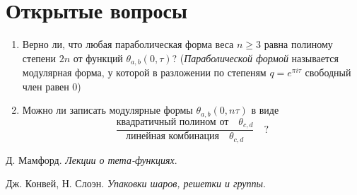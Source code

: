 \documentclass{article}
\theoremstyle{break}
\begin{document}
\section{Открытые вопросы}
\begin{enumerate}
	\item Верно ли, что любая параболическая форма веса $n \ge 3$ равна полиному
	степени $2n$ от функций $\theta_{a, b}(0, \tau)$?
	(\textit{Параболической формой} называется модулярная форма, у которой в разложении по степеням $q=e^{\pi i \tau}$ свободный член равен 0)
	\item Можно ли записать модулярные формы $\theta_{a, b}(0, n\tau)$ в виде
	\begin{equation}
	\frac{\text{квадратичный полином от} \quad \theta_{c, d}}{\text{линейная комбинация} \quad \theta_{c, d}}
	\quad ?
	\end{equation}
\end{enumerate}

\begin{thebibliography}{999}
	
	Д. Мамфорд.
	\emph{Лекции о тета-функциях}.
	
	Дж. Конвей, Н. Слоэн. 
	\emph{Упаковки шаров, решетки и группы}.
	
\end{thebibliography}
\end{document}
